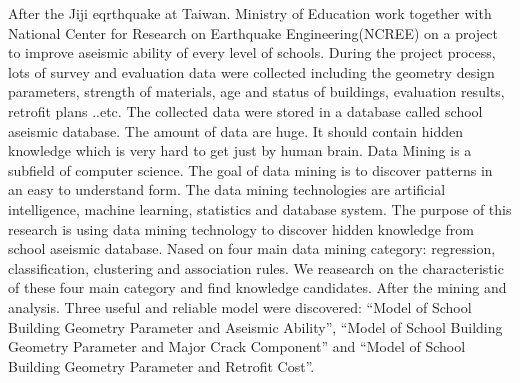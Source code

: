 
After the Jiji eqrthquake at Taiwan. Ministry of Education work together with National Center for Research on Earthquake Engineering(NCREE) on a project to improve aseismic ability of every level of schools. During the project process, lots of survey and evaluation data were collected including the geometry design parameters, strength of materials, age and status of buildings, evaluation results, retrofit plans ..etc. The collected data were stored in a database called school aseismic database. The amount of data are huge. It should contain hidden knowledge which is very hard to get just by human brain. Data Mining is a subfield of computer science. The goal of data mining is to discover patterns in an easy to understand form. The data mining technologies are artificial intelligence, machine learning, statistics and database system. The purpose of this research is using data mining technology to discover hidden knowledge from school aseismic database. Nased on four main data mining category: regression, classification, clustering and association rules. We reasearch on the characteristic of these four main category and find knowledge candidates. After the mining and analysis. Three useful and reliable model were discovered: ``Model of School Building Geometry Parameter and Aseismic Ability'', ``Model of School Building Geometry Parameter and Major Crack Component'' and ``Model of School Building Geometry Parameter and Retrofit Cost''.


